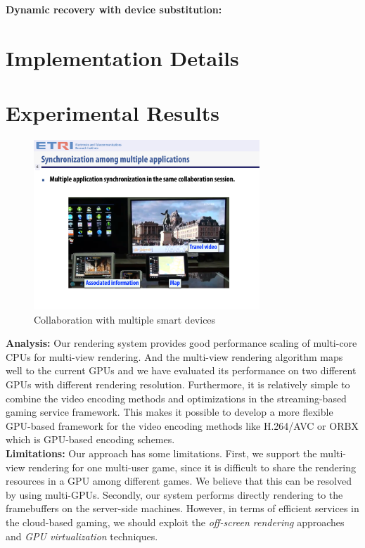 \documentclass{sig-alternate}
\begin{document}
\noindent
\textbf{Dynamic recovery with device substitution:}  

\section{Implementation Details}
%
\section{Experimental Results}
%
    \begin{figure}[htb] %
    \centering
    \includegraphics[width=8.5cm,keepaspectratio]{multiplecollaboration}
    \caption{Collaboration with multiple smart devices}
    \label{fig:multiplecollaboration}
    \end{figure}
%
    \noindent
    {\bf Analysis:} Our rendering system provides good performance scaling of multi-core CPUs for multi-view rendering.
    And the multi-view rendering algorithm maps well to the current GPUs and we have evaluated its performance on two different GPUs with different rendering resolution.
    Furthermore, it is relatively simple to combine the video encoding methods and optimizations in the streaming-based gaming service framework. This makes it possible to develop a more flexible GPU-based framework for the video encoding methods like H.264/AVC or ORBX which is GPU-based encoding schemes.\\

   \noindent
    {\bf Limitations:}
    Our approach has some limitations.
    First, we support the multi-view rendering for one multi-user game, since it is difficult to share the rendering resources in a GPU among different games. We believe that this can be resolved by using multi-GPUs.
    Secondly, our system performs directly rendering to the framebuffers on the server-side machines.
    However, in terms of efficient services in the cloud-based gaming, we should exploit the \emph{off-screen rendering} approaches and \emph{GPU virtualization} techniques.
\end{document}
